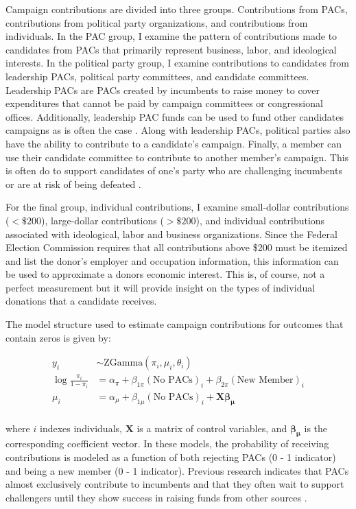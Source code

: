 \documentclass[12pt]{article}
\begin{document}
Campaign contributions are divided into three groups. Contributions from PACs, contributions from political party organizations, and contributions from individuals. In the PAC group, I examine the pattern of contributions made to candidates from PACs that primarily represent business, labor, and ideological interests. In the political party group, I examine contributions to candidates from leadership PACs, political party committees, and candidate committees. Leadership PACs are PACs created by incumbents to raise money to cover expenditures that cannot be paid by campaign committees or congressional offices. Additionally, leadership PAC funds can be used to fund other candidates campaigns as is often the case \citep{lazer2015}. Along with leadership PACs, political parties also have the ability to contribute to a candidate's campaign. Finally, a member can use their candidate committee to contribute to another member's campaign. This is often do to support candidates of one's party who are challenging incumbents or are at risk of being defeated \citep{lazer2015a}. 

For the final group, individual contributions, I examine small-dollar contributions ($< \$200$), large-dollar contributions ($> \$200$), and individual contributions associated with ideological, labor and business organizations. Since the Federal Election Commission requires that all contributions above \$200 must be itemized and list the donor's employer and occupation information, this information can be used to approximate a donors economic interest. This is, of course, not a perfect measurement but it will provide insight on the types of individual donations that a candidate receives. 

The model structure used to estimate campaign contributions for outcomes that contain zeros is given by: 

$$
\begin{aligned}
	y_i &\sim \text{ZGamma}(\pi_i, \mu_i, \theta_i) \\
	\log \frac{\pi_i}{1 - \pi_i} &= \alpha_{\pi} + \beta_{1\pi} (\text{No PACs})_i + \beta_{2\pi} (\text{New Member})_i \\
	\mu_i &= \alpha_{\mu} + \beta_{1\mu} (\text{No PACs})_i + \bm{X} \bm{\beta_{\mu}} \\
\end{aligned}
$$

\noindent where $i$ indexes individuals, $\bm{X}$ is a matrix of control variables, and $\bm{\beta_{\mu}}$ is the corresponding coefficient vector. In these models, the probability of receiving contributions is modeled as a function of both rejecting PACs (0 - 1 indicator) and being a new member (0 - 1 indicator). Previous research indicates that PACs almost exclusively contribute to incumbents \citep{brunell2005} and that they often wait to support challengers until they show success in raising funds from other sources \citep{biersack1993}. 
\end{document}
